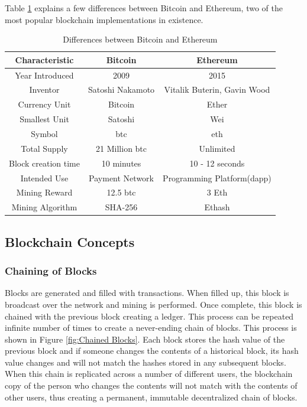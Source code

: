 \documentclass[11pt,openright]{report}
\begin{document}
Table \ref{differences_bitcoin_ethereum} explains a few differences between Bitcoin and Ethereum, two of the most popular blockchain implementations in existence.
 
\begin{table}[!htbp]
	\renewcommand{\arraystretch}{1.3}
	\caption{Differences between Bitcoin and Ethereum}
	\label{differences_bitcoin_ethereum}
	\centering
	\begin{tabular}{|c||c|c|}
		\hline
		\bfseries Characteristic & \bfseries Bitcoin & \bfseries Ethereum\\
		\hline\hline
	    Year Introduced & 2009 & 2015\\ \hline
	    Inventor & Satoshi Nakamoto & Vitalik Buterin, Gavin Wood\\ \hline
	    Currency Unit & Bitcoin & Ether\\ \hline
	    Smallest Unit & Satoshi & Wei\\ \hline
	    Symbol & btc & eth \\ \hline
	    Total Supply & 21 Million btc & Unlimited\\ \hline
	    Block creation time & 10 minutes & 10 - 12 seconds\\ \hline
	    Intended Use & Payment Network & Programming Platform(dapp)\\ \hline
	    Mining Reward & 12.5 btc & 3 Eth \\ \hline
        Mining Algorithm & SHA-256 & Ethash \\ \hline
	\end{tabular}
\end{table}

\subsection{Blockchain Concepts}
\subsubsection{Chaining of Blocks}
Blocks are generated and filled with transactions. When filled up, this block is broadcast over the network and mining is performed. Once complete, this block is chained with the previous block creating a ledger. This process can be repeated infinite number of times to create a never-ending chain of blocks. This process is shown in Figure \ref{fig:Chained Blocks}. Each block stores the hash value of the previous block and if someone changes the contents of a historical block, its hash value changes and will not match the hashes stored in any subsequent blocks. When this chain is replicated across a number of different users, the blockchain copy of the person who changes the contents will not match with the contents of other users, thus creating a permanent, immutable decentralized chain of blocks.
\end{document}
